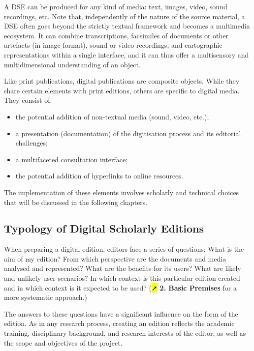 \documentclass[
  letterpaper,
  DIV=11,
  numbers=noendperiod]{scrreprt}
\begin{document}
A DSE can be produced for any kind of media: text, images, video, sound
recordings, etc. Note that, independently of the nature of the source
material, a DSE often goes beyond the strictly textual framework and
becomes a multimedia ecosystem. It can combine transcriptions,
facsimiles of documents or other artefacts (in image format), sound or
video recordings, and cartographic representations within a single
interface, and it can thus offer a multisensory and multidimensional
understanding of an object.

Like print publications, digital publications are composite objects.
While they share certain elements with print editions, others are
specific to digital media. They consist of:

\begin{itemize}
\item
  the potential addition of non-textual media (sound, video, etc.);
\item
  a presentation (documentation) of the digitisation process and its
  editorial challenges;
\item
  a multifaceted consultation interface;
\item
  the potential addition of hyperlinks to online resources.
\end{itemize}

The implementation of these elements involves scholarly and technical
choices that will be discussed in the following chapters.

\subsection{Typology of Digital Scholarly
Editions}\label{typology-of-digital-scholarly-editions}

When preparing a digital edition, editors face a series of questions:
What is the aim of my edition? From which perspective are the documents
and media analysed and represented? What are the benefits for its users?
What are likely and unlikely user scenarios? In which context is this
particular edition created and in which context is it expected to be
used? (\hl{➚} \textbf{2. Basic Premises} for a more systematic
approach.)

The answers to these questions have a significant influence on the form
of the edition. As in any research process, creating an edition reflects
the academic training, disciplinary background, and research interests
of the editor, as well as the scope and objectives of the project.
\end{document}
